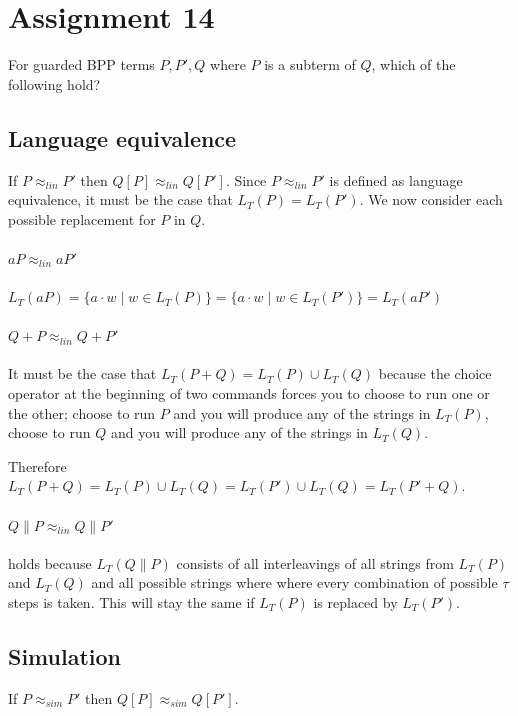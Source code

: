 \documentclass{article}
\begin{document}
\section{Assignment 14}
For guarded BPP terms $P, P', Q$ where $P$ is a subterm of $Q$, which of the following hold?

\subsection{Language equivalence}
If $P \approx_{lin} P'$ then $Q[P] \approx_{lin} Q[P']$.
Since $P \approx_{lin} P'$ is defined as language equivalence, it must be the case that $L_T(P) = L_T(P')$.
We now consider each possible replacement for $P$ in $Q$.
\paragraph{$aP \approx_{lin} aP'$} $L_T(aP) = \{a\cdot w\mid w \in L_T(P)\} = \{a\cdot w\mid w \in L_T(P')\} = L_T(aP')$
\paragraph{$Q + P \approx_{lin} Q + P'$} 
It must be the case that $L_T(P + Q) = L_T(P) \cup L_T(Q)$ because the choice operator at the beginning of two commands forces you to choose to run one or the other; 
choose to run $P$ and you will produce any of the strings in $L_T(P)$, 
choose to run $Q$ and you will produce any of the strings in $L_T(Q)$.

Therefore $L_T(P + Q) =  L_T(P) \cup L_T(Q) = L_T(P') \cup L_T(Q) = L_T(P' + Q)$.

\paragraph{$Q \parallel P \approx_{lin} Q \parallel P'$} holds because $L_T(Q \parallel P)$ consists of all interleavings of all strings from $L_T(P)$ and $L_T(Q)$ and all possible strings where where every combination of possible $\tau$ steps is taken.
This will stay the same if $L_T(P)$ is replaced by $L_T(P')$.







\subsection{Simulation}
If $P \approx_{sim} P'$ then $Q[P] \approx_{sim} Q[P']$.
\end{document}
